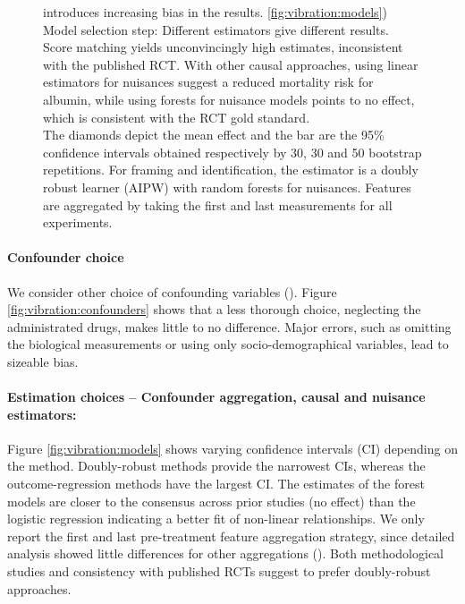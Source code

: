 \documentclass[10pt,letterpaper]{article}
\begin{document}
\begin{figure}[h!]
{        introduces increasing bias in the results. \ref{fig:vibration:models}) Model selection step:
        Different estimators give different results. Score matching yields
        unconvincingly high estimates, inconsistent with the published RCT. With
        other causal approaches, using linear estimators for nuisances suggest a
        reduced mortality risk for albumin, while using forests for nuisance models
        points to no effect, which is consistent with the RCT gold standard.
        \\The diamonds depict the mean effect and the bar are the 95\% confidence
        intervals obtained respectively by 30, 30 and 50 bootstrap repetitions. For
        framing and identification, the estimator is a doubly robust learner (AIPW)
        with random forests for nuisances. Features are aggregated by taking the
        first and last measurements for all experiments.}\label{fig:vibration_analysis}
\end{figure}


\paragraph{Confounder choice} We consider other choice of confounding variables
(). Figure
\ref{fig:vibration:confounders} shows that a less thorough choice, neglecting the
administrated drugs, makes little to no difference. Major errors, such as
omitting the biological measurements or using only socio-demographical
variables, lead to sizeable bias.

\paragraph{Estimation choices -- Confounder aggregation, causal and nuisance estimators:}

Figure \ref{fig:vibration:models} shows varying confidence intervals (CI)
depending on the method. Doubly-robust methods provide the narrowest CIs,
whereas the outcome-regression methods have the largest CI. The estimates of the
forest models are closer to the consensus across prior studies (no effect) than
the logistic regression indicating a better fit of non-linear relationships. We
only report the first and last pre-treatment feature aggregation strategy, since
detailed analysis showed little differences for other aggregations (). Both methodological studies \cite{naimi2023challenges} and
consistency with published RCTs suggest to prefer doubly-robust approaches.
\end{document}
